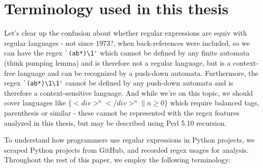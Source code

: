 \section{Terminology used in this thesis}

Let's clear up the confusion about whether regular expressions are equiv with regular languages - not since 1973?, when back-references were included, so we can have the regex \verb!`(ab*)\1'! which cannot be defined by any finite automata (think pumping lemma) and is therefore not a regular language, but is a context-free language and can be recognized by a push-down automata.  Furthermore, the regex \verb!`(ab*)\1\1'! cannot be defined by any push-down automata and is therefore a context-sensitive language.  And while we're on this topic, we should cover languages like $\{<div>^n</div>^n\| n\geq0\}$ which require balanced tags, parenthesis or similar - these cannot be represented with the regex features analyzed in this thesis, but may be described using Perl 5.10 recursion.

To understand how programmers use regular expressions in Python projects, we scraped  Python projects from GitHub, and recorded regex usages for analysis. Throughout the rest of this paper, we  employ the following terminology:\\



